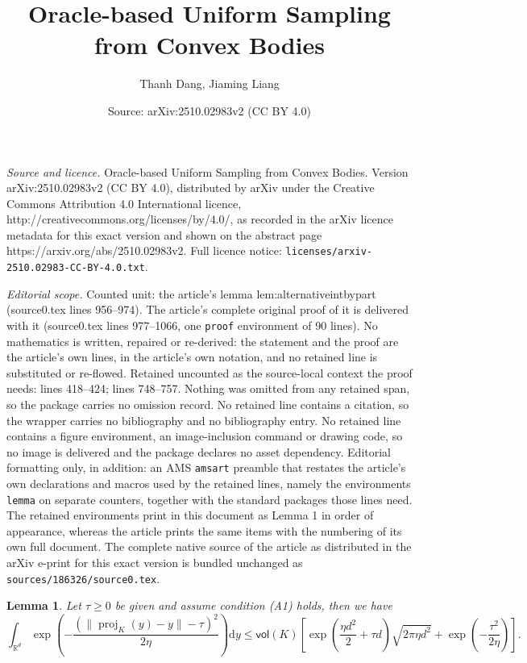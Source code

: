 \documentclass[10pt,a4paper]{amsart}
\title{Oracle-based Uniform Sampling from Convex Bodies}
\author{Thanh Dang, Jiaming Liang}
\date{Source: arXiv:2510.02983v2 (CC BY 4.0)}
\newtheorem{lemma}{Lemma}
\newcommand{\D}{\mathrm{d}}
\newcommand{\R}{\mathbb{R}}
\newcommand{\brac}[1]{\left( #1\right)}
\newcommand{\proj}{\operatorname{proj}}
\newcommand{\vol}{\mathsf{vol}}
\begin{document}
\maketitle

\noindent\emph{Source and licence.} Oracle-based Uniform Sampling from Convex Bodies. Version arXiv:2510.02983v2 (CC BY 4.0), distributed by arXiv under the Creative Commons Attribution 4.0 International licence, http://creativecommons.org/licenses/by/4.0/, as recorded in the arXiv licence metadata for this exact version and shown on the abstract page https://arxiv.org/abs/2510.02983v2. Full licence notice: \texttt{licenses/arxiv-2510.02983-CC-BY-4.0.txt}.\par\smallskip

\noindent\textit{Editorial scope.} Counted unit: the article's lemma lem:alternativeintbypart (source0.tex lines 956--974). The article's complete original proof of it is delivered with it (source0.tex lines 977--1066, one \texttt{proof} environment of 90 lines). No mathematics is written, repaired or re-derived: the statement and the proof are the article's own lines, in the article's own notation, and no retained line is substituted or re-flowed.  Retained uncounted as the source-local context the proof needs: lines 418--424; lines 748--757.  Nothing was omitted from any retained span, so the package carries no omission record.  No retained line contains a citation, so the wrapper carries no bibliography and no bibliography entry.  No retained line contains a figure environment, an image-inclusion command or drawing code, so no image is delivered and the package declares no asset dependency.  Editorial formatting only, in addition: an AMS \texttt{amsart} preamble that restates the article's own declarations and macros used by the retained lines, namely the environments \texttt{lemma} on separate counters, together with the standard packages those lines need.  The retained environments print in this document as Lemma 1 in order of appearance, whereas the article prints the same items with the numbering of its own full document.  The complete native source of the article as distributed in the arXiv e-print for this exact version is bundled unchanged as \texttt{sources/186326/source0.tex}.
\begin{lemma}\label{lem:intR}
Let $\tau\ge 0$ be given and assume condition (A1) holds, then we have
\[
      \int_{\R^d} \exp\brac{-\frac{\brac{\|\proj_K(y)-y\|-\tau}^2}{2\eta}}\D y 
    \le \vol(K) \left[\exp\left(\frac{\eta d^2}{2}+\tau d\right) \sqrt{2\pi \eta d^2}+\exp\brac{-\frac{\tau^2}{2\eta}}\right]. 
\]
\end{lemma}
\end{document}

